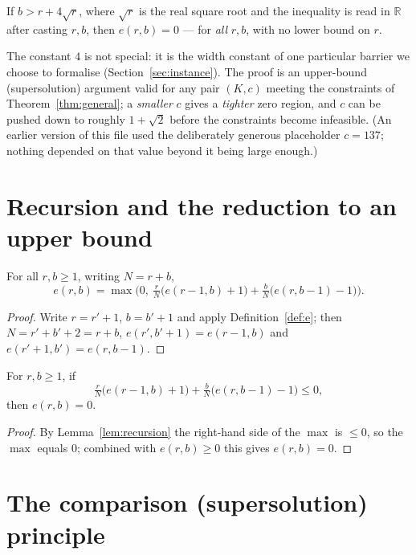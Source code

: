 \begin{theorem}\label{thm:question}
\leanok
{}
If $b>r+4\sqrt r$, where $\sqrt r$ is the real square root and the inequality is
read in $\mathbb R$ after casting $r,b$, then $e(r,b)=0$ --- for \emph{all} $r,b$,
with no lower bound on $r$.
\end{theorem}

The constant $4$ is not special: it is the width constant of one particular barrier
we choose to formalise (Section~\ref{sec:instance}). The proof is an upper-bound
(supersolution) argument valid for any pair $(K,c)$ meeting the constraints of
Theorem~\ref{thm:general}; a \emph{smaller} $c$ gives a \emph{tighter} zero region,
and $c$ can be pushed down to roughly $1+\sqrt2$ before the constraints become
infeasible. (An earlier version of this file used the deliberately generous
placeholder $c=137$; nothing depended on that value beyond it being large enough.)

\section{Recursion and the reduction to an upper bound}

\begin{lemma}\label{lem:recursion}
\leanok
{}
For all $r,b\ge 1$, writing $N=r+b$,
\[
  e(r,b)=\max\!\Big(0,\ \tfrac{r}{N}\big(e(r-1,b)+1\big)
                       +\tfrac{b}{N}\big(e(r,b-1)-1\big)\Big).
\]
\end{lemma}
\begin{proof}\leanok
Write $r=r'+1$, $b=b'+1$ and apply Definition~\ref{def:e}; then $N=r'+b'+2=r+b$,
$e(r',b'+1)=e(r-1,b)$ and $e(r'+1,b')=e(r,b-1)$.
\end{proof}

\begin{lemma}[Reduction]\label{lem:reduction}
\leanok
{}
For $r,b\ge 1$, if
\[
  \tfrac{r}{N}\big(e(r-1,b)+1\big)+\tfrac{b}{N}\big(e(r,b-1)-1\big)\le 0,
\]
then $e(r,b)=0$.
\end{lemma}
\begin{proof}\leanok
By Lemma~\ref{lem:recursion} the right-hand side of the $\max$ is $\le 0$, so the
$\max$ equals $0$; combined with $e(r,b)\ge 0$ this gives $e(r,b)=0$.
\end{proof}

\section{The comparison (supersolution) principle}

